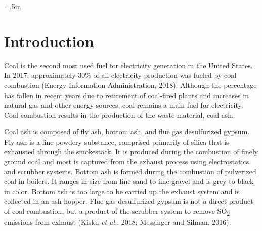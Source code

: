 \documentclass[ms, hidelinks]{uncgdissertationexp3}
\theoremstyle{plain}
\theoremstyle{definition}
\theoremstyle{remark}
\begin{document}
\tableofcontents 

\listoftables   


\listoffigures   


\mainmatter %
\raggedright\parindent=.5in
\chapter{Introduction}
Coal is the second most used fuel for electricity generation in the United States. In 2017, approximately 30\% of all electricity production was fueled by coal combustion (Energy Information Administration, 2018). Although the percentage has fallen in recent years due to retirement of coal-fired plants and increases in natural gas and other energy sources, coal remains a main fuel for electricity. Coal combustion results in the production of the waste material, coal ash.

Coal ash is composed of fly ash, bottom ash, and flue gas desulfurized gypsum. Fly ash is a fine powdery substance, comprised primarily of silica that is exhausted through the smokestack. It is produced during the combustion of finely ground coal and most is captured from the exhaust process using electrostatics and scrubber systems. Bottom ash is formed during the combustion of pulverized coal in boilers. It ranges in size from fine sand to fine gravel and is grey to black in color. Bottom ash is too large to be carried up the exhaust system and is collected in an ash hopper. Flue gas desulfurized gypsum is not a direct product of coal combustion, but a product of the scrubber system to remove SO\textsubscript{2} emissions from exhaust (Kisku \emph{et al.}, 2018; Messinger and Silman, 2016).
\end{document}
